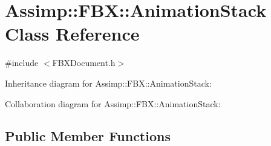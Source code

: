 \hypertarget{class_assimp_1_1_f_b_x_1_1_animation_stack}{\section{Assimp\+:\+:F\+B\+X\+:\+:Animation\+Stack Class Reference}
\label{class_assimp_1_1_f_b_x_1_1_animation_stack}
}


{\ttfamily \#include $<$F\+B\+X\+Document.\+h$>$}



Inheritance diagram for Assimp\+:\+:F\+B\+X\+:\+:Animation\+Stack\+:


Collaboration diagram for Assimp\+:\+:F\+B\+X\+:\+:Animation\+Stack\+:
\subsection*{Public Member Functions}
